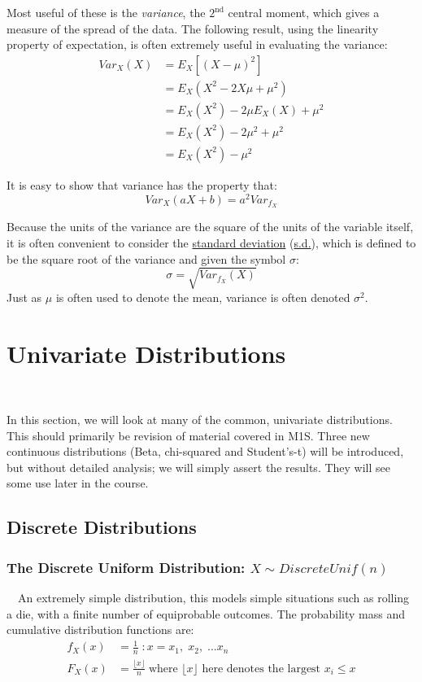 \documentclass[12pt,a4paper]{article}
\begin{document}
Most useful of these is the \emph{variance}, the $\mathrm{2^{nd}}$ central moment, which gives a measure of the spread of the data. The following result, using the linearity property of expectation, is often extremely useful in evaluating the variance:
\begin{align*}
Var_{X}(X) &= E_{X}[(X - \mu)^2]\\
&= E_{X}(X^2 - 2X\mu + \mu^2)\\
&= E_{X}(X^2) - 2\mu E_{X}(X) + \mu^2\\
&= E_{X}(X^2) - 2\mu^2 + \mu^2\\
&= E_{X}(X^2) - \mu^2
\end{align*}

It is easy to show that variance has the property that:
$$Var_{X}(aX + b) = a^2 Var_{f_X}$$

Because the units of the variance are the square of the units of the variable itself, it is often convenient to consider the \underline{standard deviation} (\underline{s.d.}), which is defined to be the square root of the variance and given the symbol $\sigma$:
$$\sigma = \sqrt{Var_{f_X}(X)}$$
Just as $\mu$ is often used to denote the mean, variance is often denoted $\sigma^2$.

\clearpage
\section{Univariate Distributions}$\;$

In this section, we will look at many of the common, univariate distributions. This should primarily be revision of material covered in M1S. Three new continuous distributions (Beta, chi-squared and Student's-t) will be introduced, but without detailed analysis; we will simply assert the results. They will see some use later in the course.

\subsection{Discrete Distributions}

\subsubsection{The Discrete Uniform Distribution: $X \sim DiscreteUnif(n)$}

$\quad$An extremely simple distribution, this models simple situations such as rolling a die, with a finite number of equiprobable outcomes. The probability mass and cumulative distribution functions are:
\begin{align*}
f_X(x) &= \frac{1}{n} \; : x = x_1, \; x_2, \; ... x_n\\
F_X(x) &= \frac{\lfloor x \rfloor}{n} \; \mbox{where $\lfloor x \rfloor$ here denotes the largest $x_i \leq x$}
\end{align*}
\end{document}
